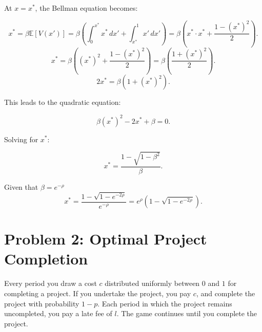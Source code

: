 \documentclass[11pt]{extarticle}
\theoremstyle{plain}
\theoremstyle{definition}
\begin{document}
\begin{enumerate}[(a)]
At \( x = x^* \), the Bellman equation becomes:

\[
x^* = \beta \mathbb{E}[V(x')] = \beta \left( \int_{0}^{x^*} x^* \, dx' + \int_{x^*}^{1} x' \, dx' \right) = \beta \left( x^* \cdot x^* + \frac{1 - (x^*)^2}{2} \right).
\]
\[
x^* = \beta \left( (x^*)^2 + \frac{1 - (x^*)^2}{2} \right) = \beta \left( \frac{1 + (x^*)^2}{2} \right).
\]
\[
2 x^* = \beta \left( 1 + (x^*)^2 \right).
\]

This leads to the quadratic equation:

\[
\beta (x^*)^2 - 2 x^* + \beta = 0.
\]

Solving for \( x^* \):

\[
x^* = \frac{1 - \sqrt{1 - \beta^2}}{\beta}.
\]

Given that $\beta=e^{-\rho}$
\[
x^* = \frac{1 - \sqrt{1 - e^{-2\rho}}}{e^{-\rho}} = e^\rho \left( 1 - \sqrt{1 - e^{-2\rho}} \right).
\]
\end{enumerate}



\vspace{5mm}
\section*{Problem 2: Optimal Project Completion}

Every period you draw a cost $c$ distributed uniformly between $0$ and $1$ for completing a project. If you undertake the project, you pay $c$, and complete the project with probability $1-p$. Each period in which the project remains uncompleted, you pay a late fee of $l$. The game continues until you complete the project.
\end{document}

